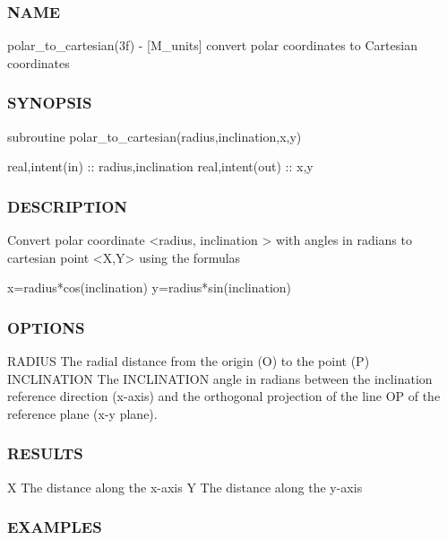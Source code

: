 \subsubsection*{N\+A\+ME}

polar\+\_\+to\+\_\+cartesian(3f) -\/ \mbox{[}M\+\_\+units\mbox{]} convert polar coordinates to Cartesian coordinates \subsubsection*{S\+Y\+N\+O\+P\+S\+IS}

subroutine polar\+\_\+to\+\_\+cartesian(radius,inclination,x,y)

real,intent(in) \+:\+: radius,inclination real,intent(out) \+:\+: x,y

\subsubsection*{D\+E\+S\+C\+R\+I\+P\+T\+I\+ON}

\begin{DoxyVerb} Convert polar coordinate <radius, inclination > with
 angles in radians to cartesian point <X,Y> using the formulas

   x=radius*cos(inclination)
   y=radius*sin(inclination)
\end{DoxyVerb}


\subsubsection*{O\+P\+T\+I\+O\+NS}

\begin{DoxyVerb}RADIUS       The radial distance from the origin (O) to the point (P)
INCLINATION  The INCLINATION angle in radians between the inclination reference direction
             (x-axis) and the orthogonal projection of the line OP of the
             reference plane (x-y plane).
\end{DoxyVerb}


\subsubsection*{R\+E\+S\+U\+L\+TS}

\begin{DoxyVerb}X  The distance along the x-axis
Y  The distance along the y-axis
\end{DoxyVerb}


\subsubsection*{E\+X\+A\+M\+P\+L\+ES}

